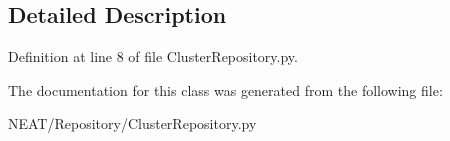 \subsection{Detailed Description}


Definition at line 8 of file Cluster\+Repository.\+py.



The documentation for this class was generated from the following file\+:\begin{DoxyCompactItemize}
\item 
N\+E\+A\+T/\+Repository/Cluster\+Repository.\+py\end{DoxyCompactItemize}
